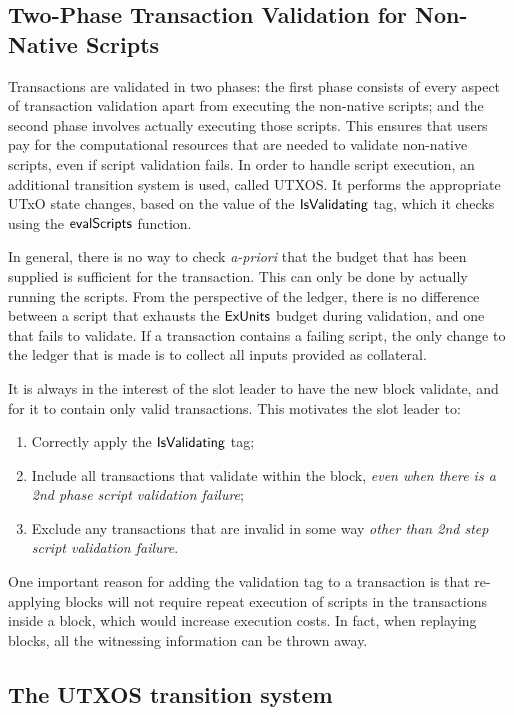 \subsection{Two-Phase Transaction Validation for Non-Native Scripts}
\label{sec:two-phase}

Transactions are validated in two phases:
the first phase consists of every aspect of transaction validation apart from executing the non-native scripts; and
the second phase involves actually executing those scripts.
This ensures that users pay for the computational resources that are needed to validate non-native scripts, even
if script validation fails. %
In order to handle script execution, an additional transition system is used, called UTXOS.
It performs the appropriate UTxO state changes, based on the
value of the $\mathsf{IsValidating}$ tag, which it checks using the $\mathsf{evalScripts}$ function.

In general, there is no way to check \emph{a-priori} that the budget that has been supplied is sufficient for the transaction.
This can only be done by actually running the scripts. From the perspective of the ledger, there is no difference
between a script that exhausts the $\mathsf{ExUnits}$ budget during validation, and one that fails to validate.
If a transaction contains a failing script, the only change to the ledger that is made
is to collect all inputs provided as collateral.

It is always in the interest of the slot leader to have the new block validate,
and for it to contain only valid transactions. This motivates the
slot leader to:

\begin{enumerate}
  \item Correctly apply the $\mathsf{IsValidating}$ tag;
  \item Include all transactions that validate within the block,
  \textit{even when there is a 2nd phase script validation failure};
  \item Exclude any transactions that are invalid in some way \textit{other than 2nd step script validation failure}.
\end{enumerate}

One important reason for adding the validation tag
to a transaction is that re-applying blocks will not require repeat
execution of scripts in the transactions inside a block, which would increase execution costs.
In fact, when replaying
blocks, all the witnessing information can be thrown away.

\subsection{The UTXOS transition system}
\label{sec:utxo-state-trans}

